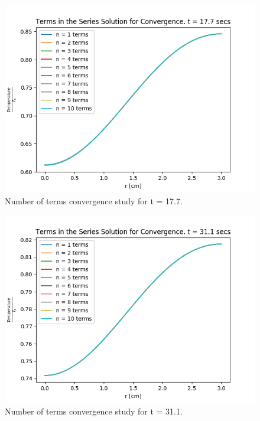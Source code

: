\documentclass[12pt,letterpaper]{article}
\begin{document}
\begin{figure}[htbp!]
  \begin{center}
    \includegraphics[scale=0.7]{terms_177.png}
  \end{center}
  \caption{Number of terms convergence study for t = 17.7.}
  \label{fig:17}
\end{figure}

\begin{figure}[htbp!]
  \begin{center}
    \includegraphics[scale=0.7]{terms_311.png}
  \end{center}
  \caption{Number of terms convergence study for t = 31.1.}
  \label{fig:31}
\end{figure}
\end{document}

